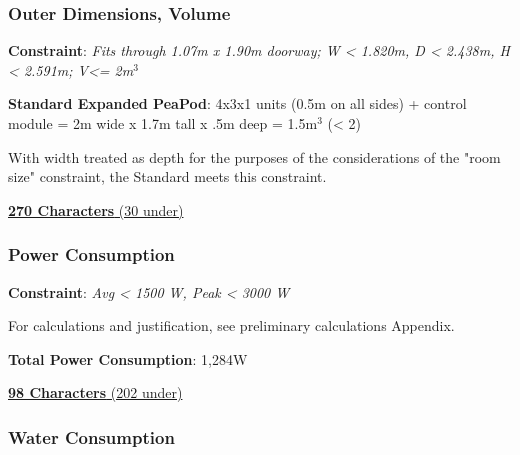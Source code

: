 \documentclass{report}
\begin{document}
\subsubsection{Outer Dimensions, Volume}
\label{sec:constraints-volume}

\textbf{Constraint}: \textit{Fits through 1.07m x 1.90m doorway; W < 1.820m, D < 2.438m, H < 2.591m; V<= 2m${}^3$}



\textbf{Standard Expanded PeaPod}: 4x3x1 units (0.5m on all sides) + control module = 2m wide x 1.7m tall x .5m deep = 1.5m${}^3$ (< 2)

With width treated as depth for the purposes of the considerations of the "room size" constraint, the Standard meets this constraint.

\uline{\textbf{270 Characters} (30 under)}

\vspace{0.5cm}

\subsubsection{Power Consumption}
\label{sec:constraints-power}

\textbf{Constraint}: \textit{Avg < 1500 W, Peak < 3000 W}

For calculations and justification, see preliminary calculations Appendix.

\textbf{Total Power Consumption}: 1,284W

\uline{\textbf{98 Characters} (202 under)}

\newpage

\subsubsection{Water Consumption}
\label{sec:constraints-water}
\end{document}
